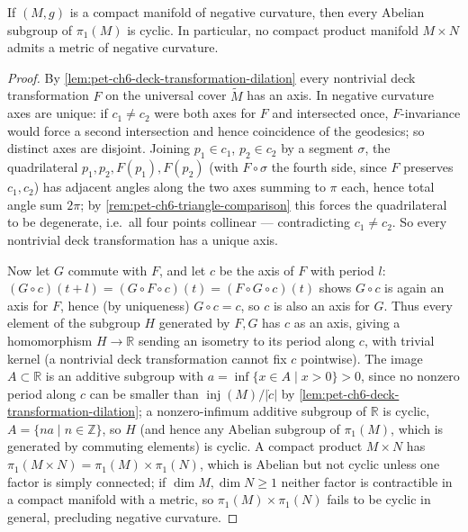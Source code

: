 \begin{theorem}
  \label{thm:pet-ch6-preissmann}
  If $(M,g)$ is a compact manifold of negative curvature, then every Abelian
  subgroup of $\pi_1(M)$ is cyclic. In particular, no compact product manifold
  $M\times N$ admits a metric of negative curvature.
\end{theorem}
\begin{proof}
  By \cref{lem:pet-ch6-deck-transformation-dilation} every nontrivial deck
  transformation $F$ on the universal cover $\tilde M$ has an axis. In
  negative curvature axes are unique: if $c_1\ne c_2$ were both axes for $F$
  and intersected once, $F$-invariance would force a second intersection and
  hence coincidence of the geodesics; so distinct axes are disjoint. Joining
  $p_1\in c_1$, $p_2\in c_2$ by a segment $\sigma$, the quadrilateral
  $p_1,p_2,F(p_1),F(p_2)$ (with $F\circ\sigma$ the fourth side, since $F$
  preserves $c_1,c_2$) has adjacent angles along the two axes summing to
  $\pi$ each, hence total angle sum $2\pi$; by
  \cref{rem:pet-ch6-triangle-comparison} this forces the quadrilateral to be
  degenerate, i.e.\ all four points collinear — contradicting $c_1\ne c_2$.
  So every nontrivial deck transformation has a unique axis.

  Now let $G$ commute with $F$, and let $c$ be the axis of $F$ with period
  $l$: $(G\circ c)(t+l)=(G\circ F\circ c)(t)=(F\circ G\circ c)(t)$ shows
  $G\circ c$ is again an axis for $F$, hence (by uniqueness) $G\circ c=c$, so
  $c$ is also an axis for $G$. Thus every element of the subgroup $H$
  generated by $F,G$ has $c$ as an axis, giving a homomorphism $H\to\mathbb{R}$
  sending an isometry to its period along $c$, with trivial kernel (a
  nontrivial deck transformation cannot fix $c$ pointwise). The image
  $A\subset\mathbb{R}$ is an additive subgroup with $a=\inf\{x\in A\mid x>0\}>0$,
  since no nonzero period along $c$ can be smaller than
  $\operatorname{inj}(M)/|\dot c|$ by
  \cref{lem:pet-ch6-deck-transformation-dilation}; a nonzero-infimum additive
  subgroup of $\mathbb{R}$ is cyclic, $A=\{na\mid n\in\mathbb{Z}\}$, so $H$ (and hence
  any Abelian subgroup of $\pi_1(M)$, which is generated by commuting
  elements) is cyclic. A compact product $M\times N$ has $\pi_1(M\times
  N)=\pi_1(M)\times\pi_1(N)$, which is Abelian but not cyclic unless one
  factor is simply connected; if $\dim M,\dim N\ge1$ neither factor is
  contractible in a compact manifold with a metric, so $\pi_1(M)\times
  \pi_1(N)$ fails to be cyclic in general, precluding negative curvature.
\end{proof}


